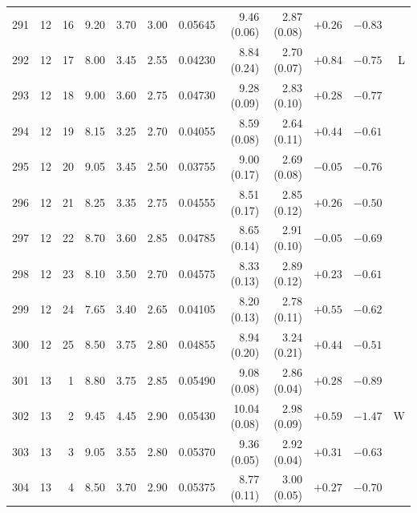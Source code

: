 \begin{longtable}{@{}rrrrrrrrrrrr@{}}
291 & 12 & 16 & \num{9.20} & \num{3.70} & \num{3.00} & \num{0.05645} & \num{9.46} (\num{0.06}) & \num{2.87} (\num{0.08}) & $+\num{0.26}$ & $-\num{0.83}$ &  \\
292 & 12 & 17 & \num{8.00} & \num{3.45} & \num{2.55} & \num{0.04230} & \num{8.84} (\num{0.24}) & \num{2.70} (\num{0.07}) & $+\num{0.84}$ & $-\num{0.75}$ & L \\
293 & 12 & 18 & \num{9.00} & \num{3.60} & \num{2.75} & \num{0.04730} & \num{9.28} (\num{0.09}) & \num{2.83} (\num{0.10}) & $+\num{0.28}$ & $-\num{0.77}$ &  \\
294 & 12 & 19 & \num{8.15} & \num{3.25} & \num{2.70} & \num{0.04055} & \num{8.59} (\num{0.08}) & \num{2.64} (\num{0.11}) & $+\num{0.44}$ & $-\num{0.61}$ &  \\
295 & 12 & 20 & \num{9.05} & \num{3.45} & \num{2.50} & \num{0.03755} & \num{9.00} (\num{0.17}) & \num{2.69} (\num{0.08}) & $-\num{0.05}$ & $-\num{0.76}$ &  \\
296 & 12 & 21 & \num{8.25} & \num{3.35} & \num{2.75} & \num{0.04555} & \num{8.51} (\num{0.17}) & \num{2.85} (\num{0.12}) & $+\num{0.26}$ & $-\num{0.50}$ &  \\
297 & 12 & 22 & \num{8.70} & \num{3.60} & \num{2.85} & \num{0.04785} & \num{8.65} (\num{0.14}) & \num{2.91} (\num{0.10}) & $-\num{0.05}$ & $-\num{0.69}$ &  \\
298 & 12 & 23 & \num{8.10} & \num{3.50} & \num{2.70} & \num{0.04575} & \num{8.33} (\num{0.13}) & \num{2.89} (\num{0.12}) & $+\num{0.23}$ & $-\num{0.61}$ &  \\
299 & 12 & 24 & \num{7.65} & \num{3.40} & \num{2.65} & \num{0.04105} & \num{8.20} (\num{0.13}) & \num{2.78} (\num{0.11}) & $+\num{0.55}$ & $-\num{0.62}$ &  \\
300 & 12 & 25 & \num{8.50} & \num{3.75} & \num{2.80} & \num{0.04855} & \num{8.94} (\num{0.20}) & \num{3.24} (\num{0.21}) & $+\num{0.44}$ & $-\num{0.51}$ &  \\
301 & 13 & 1 & \num{8.80} & \num{3.75} & \num{2.85} & \num{0.05490} & \num{9.08} (\num{0.08}) & \num{2.86} (\num{0.04}) & $+\num{0.28}$ & $-\num{0.89}$ &  \\
302 & 13 & 2 & \num{9.45} & \num{4.45} & \num{2.90} & \num{0.05430} & \num{10.04} (\num{0.08}) & \num{2.98} (\num{0.09}) & $+\num{0.59}$ & $-\num{1.47}$ & W \\
303 & 13 & 3 & \num{9.05} & \num{3.55} & \num{2.80} & \num{0.05370} & \num{9.36} (\num{0.05}) & \num{2.92} (\num{0.04}) & $+\num{0.31}$ & $-\num{0.63}$ &  \\
304 & 13 & 4 & \num{8.50} & \num{3.70} & \num{2.90} & \num{0.05375} & \num{8.77} (\num{0.11}) & \num{3.00} (\num{0.05}) & $+\num{0.27}$ & $-\num{0.70}$ &  \\

\end{longtable}
